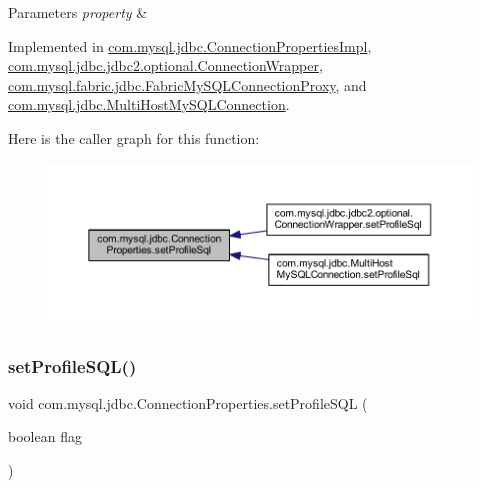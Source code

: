 \begin{DoxyParams}{Parameters}
{\em property} & \\
\hline
\end{DoxyParams}


Implemented in \mbox{\hyperlink{classcom_1_1mysql_1_1jdbc_1_1_connection_properties_impl_a0b1cfb3232b57decb11d935b913e1187}{com.\+mysql.\+jdbc.\+Connection\+Properties\+Impl}}, \mbox{\hyperlink{classcom_1_1mysql_1_1jdbc_1_1jdbc2_1_1optional_1_1_connection_wrapper_afe33bc3a8bc2ecba4e453c1bcb3d5d2d}{com.\+mysql.\+jdbc.\+jdbc2.\+optional.\+Connection\+Wrapper}}, \mbox{\hyperlink{classcom_1_1mysql_1_1fabric_1_1jdbc_1_1_fabric_my_s_q_l_connection_proxy_af785970d3a07550d56c5c2383c902cef}{com.\+mysql.\+fabric.\+jdbc.\+Fabric\+My\+S\+Q\+L\+Connection\+Proxy}}, and \mbox{\hyperlink{classcom_1_1mysql_1_1jdbc_1_1_multi_host_my_s_q_l_connection_a3da8b80a49c914ce7bcead678775fbbc}{com.\+mysql.\+jdbc.\+Multi\+Host\+My\+S\+Q\+L\+Connection}}.

Here is the caller graph for this function\+:\nopagebreak
\begin{figure}[H]
\begin{center}
\leavevmode
\includegraphics[width=350pt]{interfacecom_1_1mysql_1_1jdbc_1_1_connection_properties_a6e32297fa42ce676613c35580365416a_icgraph}
\end{center}
\end{figure}
\mbox{\label{interfacecom_1_1mysql_1_1jdbc_1_1_connection_properties_a6c91e5a3250a313eee67f7174599be99}} 
\subsubsection{\texorpdfstring{set\+Profile\+S\+Q\+L()}{setProfileSQL()}}
{\footnotesize\ttfamily void com.\+mysql.\+jdbc.\+Connection\+Properties.\+set\+Profile\+S\+QL (\begin{DoxyParamCaption}\item[{boolean}]{flag }\end{DoxyParamCaption})}


